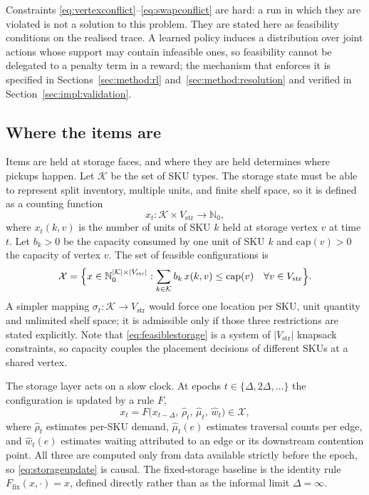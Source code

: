 \documentclass[../main.tex]{subfiles}
\begin{document}
Constraints \eqref{eq:vertexconflict}--\eqref{eq:swapconflict} are hard: a run in
which they are violated is not a solution to this problem. They are stated here
as feasibility conditions on the realised trace. A learned policy induces a
distribution over joint actions whose support may contain infeasible ones, so
feasibility cannot be delegated to a penalty term in a reward; the mechanism that
enforces it is specified in Sections~\ref{sec:method:rl}
and~\ref{sec:method:resolution} and verified in Section~\ref{sec:impl:validation}.

\subsection{Where the items are}
\label{sec:pf:storage}

Items are held at storage faces, and where they are held determines where pickups
happen. Let $\mathcal{K}$ be the set of SKU types. The storage state must be able
to represent split inventory, multiple units, and finite shelf space, so it is
defined as a counting function
\[
  x_t : \mathcal{K} \times V_{\mathrm{str}} \to \mathbb{N}_0 ,
\]
where $x_t(k,v)$ is the number of units of SKU $k$ held at storage vertex $v$ at
time $t$. Let $b_k > 0$ be the capacity consumed by one unit of SKU $k$ and
$\mathrm{cap}(v) > 0$ the capacity of vertex $v$. The set of feasible
configurations is
\begin{equation}
  \mathcal{X} =
  \Bigl\{ x \in \mathbb{N}_0^{|\mathcal{K}| \times |V_{\mathrm{str}}|} :
    \sum_{k \in \mathcal{K}} b_k\, x(k,v) \le \mathrm{cap}(v)
    \quad \forall v \in V_{\mathrm{str}} \Bigr\}.
  \label{eq:feasiblestorage}
\end{equation}
A simpler mapping $\sigma_t : \mathcal{K} \to V_{\mathrm{str}}$ would force one
location per SKU, unit quantity and unlimited shelf space; it is admissible only
if those three restrictions are stated explicitly. Note that
\eqref{eq:feasiblestorage} is a system of $|V_{\mathrm{str}}|$ knapsack
constraints, so capacity couples the placement decisions of different SKUs at a
shared vertex.

The storage layer acts on a slow clock. At epochs
$t \in \{\Delta, 2\Delta, \dots\}$ the configuration is updated by a rule $F$,
\begin{equation}
  x_t = F\bigl(x_{t-\Delta},\, \hat{\rho}_t,\, \hat{\mu}_t,\, \hat{w}_t\bigr)
        \in \mathcal{X} ,
  \label{eq:storageupdate}
\end{equation}
where $\hat{\rho}_t$ estimates per-SKU demand, $\hat{\mu}_t(e)$ estimates
traversal counts per edge, and $\hat{w}_t(e)$ estimates waiting attributed to an
edge or its downstream contention point. All three are computed only from data
available strictly before the epoch, so \eqref{eq:storageupdate} is causal. The
fixed-storage baseline is the identity rule $F_{\mathrm{fix}}(x,\cdot) = x$,
defined directly rather than as the informal limit $\Delta = \infty$.
\end{document}
